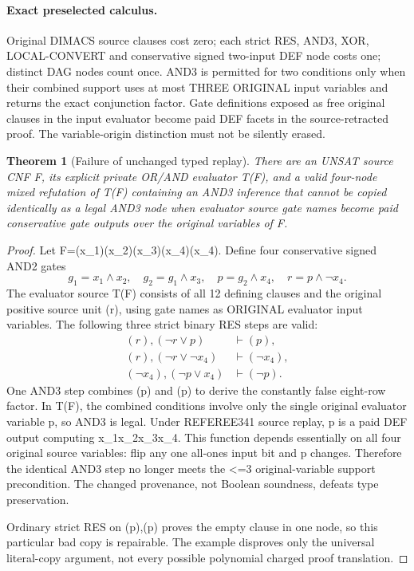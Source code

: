 \documentclass[11pt]{article}
\newtheorem{theorem}{Theorem}
\begin{document}
\paragraph{Exact preselected calculus.} Original DIMACS source clauses cost zero; each strict RES, AND3, XOR, LOCAL-CONVERT and conservative signed two-input DEF node costs one; distinct DAG nodes count once. AND3 is permitted for two conditions only when their combined support uses at most THREE ORIGINAL input variables and returns the exact conjunction factor. Gate definitions exposed as free original clauses in the input evaluator become paid DEF facets in the source-retracted proof. The variable-origin distinction must not be silently erased.

\begin{theorem}[Failure of unchanged typed replay]
There are an UNSAT source CNF F, its explicit private OR/AND evaluator T(F), and a valid four-node mixed refutation of T(F) containing an AND3 inference that cannot be copied identically as a legal AND3 node when evaluator source gate names become paid conservative gate outputs over the original variables of F.
\end{theorem}
\begin{proof}
Let F=(x_1)\wedge(x_2)\wedge(x_3)\wedge(x_4)\wedge(\neg x_4). Define four conservative signed AND2 gates
\[
g_1=x_1\land x_2,\quad
g_2=g_1\land x_3,\quad
p=g_2\land x_4,\quad
r=p\land\neg x_4.
\]
The evaluator source T(F) consists of all 12 defining clauses and the original positive source unit (r), using gate names as ORIGINAL evaluator input variables. The following three strict binary RES steps are valid:
\[
\begin{array}{rl}
(r),(\neg r\lor p)&\vdash(p),\\
(r),(\neg r\lor\neg x_4)&\vdash(\neg x_4),\\
(\neg x_4),(\neg p\lor x_4)&\vdash(\neg p).
\end{array}
\]
One AND3 step combines (p) and (\neg p) to derive the constantly false eight-row factor. In T(F), the combined conditions involve only the single original evaluator variable p, so AND3 is legal. Under REFEREE341 source replay, p is a paid DEF output computing x_1x_2x_3x_4. This function depends essentially on all four original source variables: flip any one all-ones input bit and p changes. Therefore the identical AND3 step no longer meets the <=3 original-variable support precondition. The changed provenance, not Boolean soundness, defeats type preservation.

Ordinary strict RES on (p),(\neg p) proves the empty clause in one node, so this particular bad copy is repairable. The example disproves only the universal literal-copy argument, not every possible polynomial charged proof translation.
\end{proof}
\end{document}
